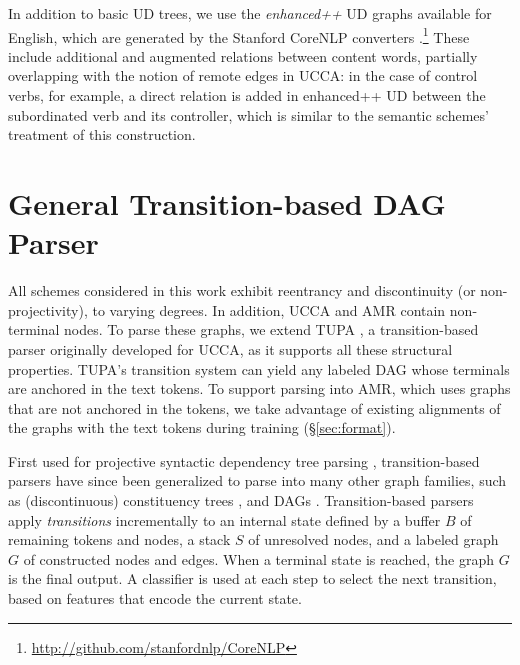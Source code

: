 \documentclass[11pt,a4paper]{article}
\begin{document}
In addition to basic UD trees, we use the \textit{enhanced++} UD graphs available for English,
which are generated by the Stanford CoreNLP converters
\cite{SCHUSTER16.779}.\footnote{\url{http://github.com/stanfordnlp/CoreNLP}}
These include additional and augmented relations between content words,
partially overlapping with the notion of remote edges in UCCA:
in the case of control verbs, for example, a direct relation is added in 
enhanced++ UD between the subordinated verb and its controller,
which is similar to the semantic schemes' treatment of this construction.


\section{General Transition-based DAG Parser}\label{sec:model}

All schemes considered in this work exhibit
reentrancy and discontinuity (or non-projectivity), to varying degrees.
In addition, UCCA and AMR contain non-terminal nodes.
To parse these graphs,
we extend TUPA \cite{hershcovich2017a}, 
a transition-based parser 
originally developed for UCCA,  as it
supports all these structural properties.
TUPA's transition system can yield any labeled DAG
whose terminals are anchored in the text tokens.
To support parsing into AMR, which uses graphs that are not anchored in the tokens,
 we take advantage of existing alignments of the graphs with the text
tokens during training (\S\ref{sec:format}).

First used for projective syntactic dependency tree parsing \cite{Nivre03anefficient},
transition-based parsers have since been generalized to parse into many other
graph families, such as (discontinuous) constituency trees \cite[e.g., ][]{zhang2009transition,maier-lichte:2016:DiscoNLP},
and DAGs \cite[e.g.,][]{sagae2008shift,du-EtAl:2015:SemEval}. %
Transition-based parsers apply \textit{transitions}
incrementally to an internal state defined by a buffer $B$ of remaining tokens 
and nodes, a stack $S$ of unresolved nodes, and a labeled graph $G$ of 
constructed nodes and edges.
When a terminal state is reached, the graph $G$ is the final output.
A classifier is used at each step to select the next transition, 
based on features that encode the current state.
\end{document}
